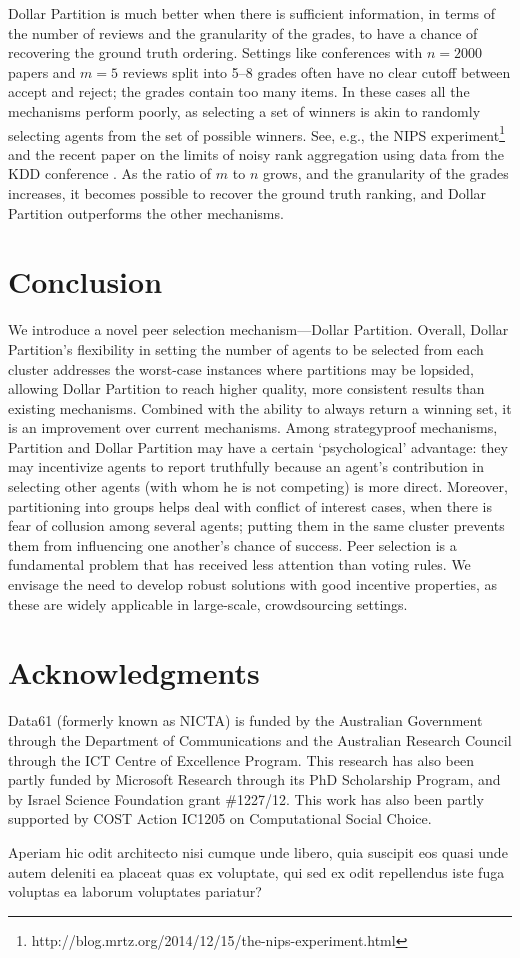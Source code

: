 \documentclass[letterpaper]{article}
\begin{document}
Dollar Partition is much better when there is sufficient information, in terms of the number of reviews and the granularity of the grades, to have a chance of recovering the ground truth ordering. Settings like conferences with $n=2000$ papers and $m=5$ reviews split into 5--8 grades often have no clear cutoff between accept and reject; the grades contain too many items. In these cases all the mechanisms perform poorly, as selecting a set of winners is akin to randomly selecting agents from the set of possible winners. See, e.g., the NIPS experiment\footnote{http://blog.mrtz.org/2014/12/15/the-nips-experiment.html} and the recent paper on the limits of noisy rank aggregation using data from the KDD conference \cite{JoRa15a}. As the ratio of $m$ to $n$ grows, and the granularity of the grades increases, it becomes possible to recover the ground truth ranking, and Dollar Partition outperforms the other mechanisms.







\section{Conclusion}

We introduce a novel peer selection mechanism---Dollar Partition.
Overall, Dollar Partition's flexibility in setting the number of agents to be selected from each cluster addresses the worst-case instances where partitions may be lopsided, allowing Dollar Partition to reach higher quality, more consistent results than existing mechanisms. Combined with the ability to always return a winning set, it is an improvement over current mechanisms.  Among strategyproof mechanisms, Partition and Dollar Partition may
have a certain `psychological' advantage: they may incentivize agents to report truthfully because an agent's contribution in selecting other agents (with whom he is not competing) is more direct.
Moreover, partitioning into groups helps deal with conflict of interest cases, when there is fear of collusion among several agents; putting them in the same cluster prevents them from influencing one another's chance of success.
Peer selection is a fundamental problem that has received less attention than voting rules.  We envisage the need to develop robust solutions with good incentive properties, as these are widely applicable in large-scale, crowdsourcing settings.

\vspace{-3.46mm}
\section*{Acknowledgments}
Data61 (formerly known as NICTA) is funded by the Australian Government through the Department of Communications and the Australian Research Council through the ICT Centre of Excellence Program. This research has also been partly funded by Microsoft Research through its PhD Scholarship Program, and by Israel Science Foundation grant \#1227/12. This work has also been partly supported by COST Action IC1205 on Computational Social Choice.

\normalsize
  Aperiam hic odit architecto nisi cumque unde libero, quia suscipit eos quasi unde autem deleniti ea placeat quas ex voluptate, qui sed ex odit repellendus iste fuga voluptas ea laborum voluptates pariatur?\clearpage

\end{document}

